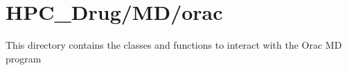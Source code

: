 

\section{HPC\_Drug/MD/orac}

    This directory contains the classes and functions to interact with the Orac MD program

    